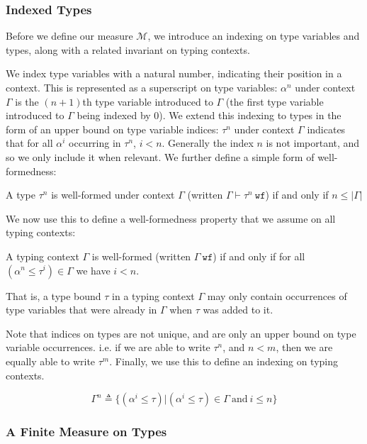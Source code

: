 \documentclass[runningheads, anon]{llncs}
\begin{document}
\subsubsection{Indexed Types}
Before we define our measure $\mathcal{M}$, we introduce an indexing on type variables and types, along with a related invariant on typing contexts.

We index type variables with a natural number, indicating their position in a context.
This is represented as a superscript on type variables: $\alpha^n$ under context $\Gamma$ is the $(n + 1)$th type variable introduced to $\Gamma$ (the first type variable introduced to $\Gamma$ being indexed by 0).
We extend this indexing to types in the form of an upper bound on type variable indices: $\tau^n$ under context
$\Gamma$ indicates that for all $\alpha^i$ occurring in $\tau^n$, $i < n$.
Generally the index $n$ is not important, and so we only include it when relevant.
We further define a simple form of well-formedness:
\begin{definition}
A type $\tau^n$ is well-formed under context $\Gamma$ (written $\Gamma \vdash \tau^n\ \texttt{wf}$) 
if and only if $n \leq |\Gamma|$
\end{definition}
We now use this to define a well-formedness property that we assume on all typing contexts:
\begin{definition}
\label{def:ctxwf}
A typing context $\Gamma$ is well-formed (written $\Gamma\ \texttt{wf}$) if and only if
for all $(\alpha^n \leqslant \tau^i) \in \Gamma$ we have $i < n$.
\end{definition}
That is, a type bound $\tau$ in a typing context $\Gamma$ may only contain occurrences of type variables that were 
already in $\Gamma$ when $\tau$ was added to it.

Note that indices on types are not unique, and are only an upper bound on type variable occurrences. i.e. if we are able to write $\tau^n$, 
and $n < m$, then we are equally able to write $\tau^m$.
Finally, we use this to define an indexing on typing contexts.
\begin{definition}
\label{def:indexedCtx}
$$\Gamma^n \triangleq \{ (\alpha^i \leqslant \tau) | (\alpha^i \leqslant \tau) \in  \Gamma \ \text{and}\ i \leq n\}$$
\end{definition}

\subsubsection{A Finite Measure on Types}
\end{document}
